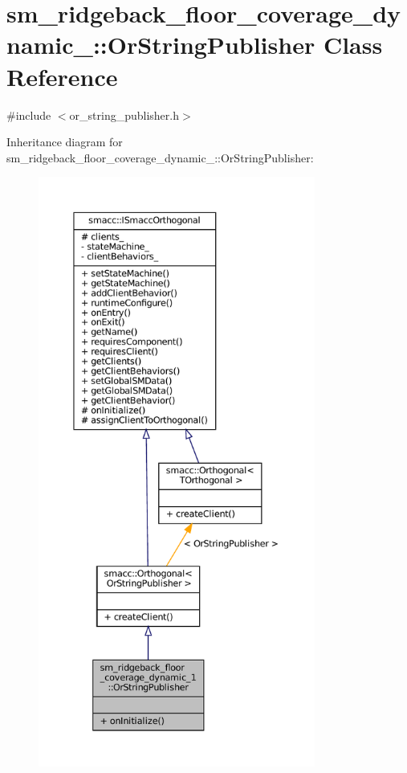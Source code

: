 \hypertarget{classsm__ridgeback__floor__coverage__dynamic__1_1_1OrStringPublisher}{}\section{sm\+\_\+ridgeback\+\_\+floor\+\_\+coverage\+\_\+dynamic\+\_\+:\+:Or\+String\+Publisher Class Reference}
\label{classsm__ridgeback__floor__coverage__dynamic__1_1_1OrStringPublisher}


{\ttfamily \#include $<$or\+\_\+string\+\_\+publisher.\+h$>$}



Inheritance diagram for sm\+\_\+ridgeback\+\_\+floor\+\_\+coverage\+\_\+dynamic\+\_\+:\+:Or\+String\+Publisher\+:
\nopagebreak
\begin{figure}[H]
\begin{center}
\leavevmode
\includegraphics[height=550pt]{classsm__ridgeback__floor__coverage__dynamic__1_1_1OrStringPublisher__inherit__graph}
\end{center}
\end{figure}


